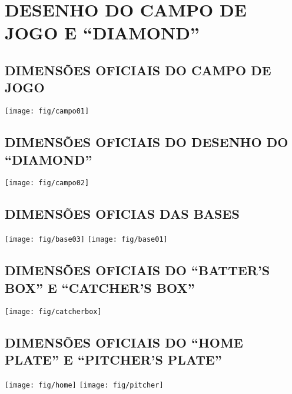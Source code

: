 \chapter{DESENHO DO CAMPO DE JOGO E “DIAMOND”}
\label{ap:Campo}

\section{DIMENSÕES OFICIAIS DO CAMPO DE JOGO} 

{\begin{center}
		\texttt{[image: fig/campo01]}
\end{center}}
\clearpage
\section{DIMENSÕES OFICIAIS DO DESENHO DO “DIAMOND” }

{\begin{center}
		\texttt{[image: fig/campo02]}\end{center}}

\section{DIMENSÕES OFICIAS DAS BASES}
{\begin{center}
		\texttt{[image: fig/base03]}
		\texttt{[image: fig/base01]}
\end{center}}

\section{DIMENSÕES OFICIAIS DO “BATTER’S BOX” E “CATCHER’S BOX” }
{\begin{center}
		\texttt{[image: fig/catcherbox]}\end{center}}

\section[\textit{Home Plate} \Gls{pitcher's plate}]{DIMENSÕES OFICIAIS DO “HOME PLATE” E “PITCHER’S PLATE”}

{\begin{center}
		\texttt{[image: fig/home]}
		\texttt{[image: fig/pitcher]}
\end{center}}

